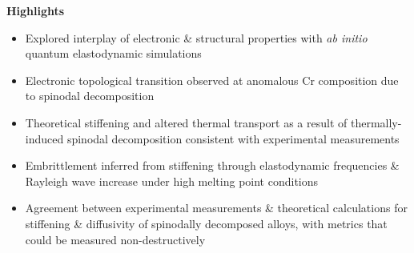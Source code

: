 \textbf{Highlights}

\begin{itemize}

\item Explored interplay of electronic \& structural properties with \emph{ab initio} quantum elastodynamic simulations
\item Electronic topological transition observed at anomalous Cr composition due to spinodal decomposition
\item Theoretical stiffening and altered thermal transport as a result of thermally-induced spinodal decomposition consistent with experimental measurements
\item Embrittlement inferred from stiffening through elastodynamic frequencies \& Rayleigh wave increase under high melting point conditions
\item Agreement between experimental measurements \& theoretical calculations for stiffening \& diffusivity of spinodally decomposed alloys, with metrics that could be measured non-destructively
\end{itemize}